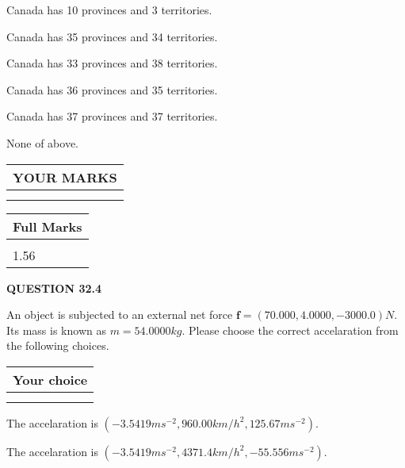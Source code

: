 \documentclass[12pt]{article}
\begin{document}
  
 
 
Canada has  %
10 provinces and  %
3 territories.
 
 
Canada has  %
35 provinces and  %
34 territories.
 
 
Canada has  %
33 provinces and  %
38 territories.
 
 
Canada has  %
36 provinces and  %
35 territories.
 
 
Canada has  %
37 provinces and  %
37 territories.
 
 
 None of above.
 
 
  
\vspace{0.2in}
  
\noindent\begin{tabular}{|l|}
\hline
 YOUR MARKS  \\
\hline
 \\ 
 \\ 
\hline
\end{tabular}
\hspace{0.05in} \begin{tabular}{|l|}
\hline
 Full Marks  \\
\hline
 \\ 
1.56 \\
\hline
\end{tabular}
{\textbf{\Large{QUESTION
32.4 
}}}
  
  
 
An object is subjected to an external net force $\mathbf{f}=(
70.000 ,
4.0000,
-3000.0  )N$. Its mass is known as
$m= %
54.0000  kg$. Please choose the correct accelaration
from the following choices.
 
  
  
\noindent\hspace{3.0in} \begin{tabular}{|l|}
\hline
Your choice \\
\hline
 \\ 
 \\ 
\hline
\end{tabular}
  
  
 
 
The accelaration is
$(
-3.5419ms^{-2},
960.00km/h^2,
125.67ms^{-2}
).
$
 
 
The accelaration is
$(
-3.5419ms^{-2},
4371.4km/h^2,
-55.556ms^{-2}
).
$
 
\end{document}

